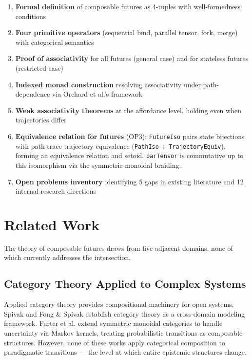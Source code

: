 \documentclass[11pt,a4paper]{article}
\begin{document}
\begin{enumerate}
\item \textbf{Formal definition} of composable futures as 4-tuples with well-formedness conditions
\item \textbf{Four primitive operators} (sequential bind, parallel tensor, fork, merge) with categorical semantics
\item \textbf{Proof of associativity} for all futures (general case) and for stateless futures (restricted case)
\item \textbf{Indexed monad construction} resolving associativity under path-dependence via Orchard et al.'s framework
\item \textbf{Weak associativity theorems} at the affordance level, holding even when trajectories differ
\item \textbf{Equivalence relation for futures} (OP3): \texttt{FutureIso} pairs state bijections with path-trace trajectory equivalence (\texttt{PathIso} + \texttt{TrajectoryEquiv}), forming an equivalence relation and setoid. \texttt{parTensor} is commutative up to this isomorphism via the symmetric-monoidal braiding.
\item \textbf{Open problems inventory} identifying 5 gaps in existing literature and 12 internal research directions
\end{enumerate}

\section{Related Work}

The theory of composable futures draws from five adjacent domains, none of which currently addresses the intersection.

\subsection{Category Theory Applied to Complex Systems}

Applied category theory provides compositional machinery for open systems. Spivak \cite{spivak2014} and Fong \& Spivak \cite{fong2018} establish category theory as a cross-domain modeling framework. Furter et al. \cite{furter2025} extend symmetric monoidal categories to handle uncertainty via Markov kernels, treating probabilistic transitions as composable structures. However, none of these works apply categorical composition to paradigmatic transitions — the level at which entire epistemic structures change.
\end{document}
